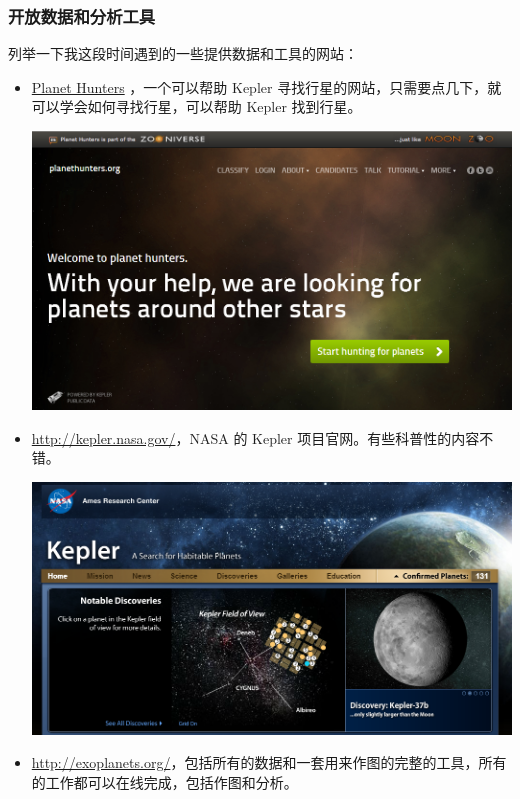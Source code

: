 \documentclass[letterpaper,10pt,english]{sphinxmanual}
\begin{document}
\subsubsection{开放数据和分析工具}
\label{intro:id16}
列举一下我这段时间遇到的一些提供数据和工具的网站：
\begin{itemize}
\item {} 
\href{http://www.planethunters.org/}{Planet Hunters} ，一个可以帮助 Kepler 寻找行星的网站，只需要点几下，就可以学会如何寻找行星，可以帮助 Kepler 找到行星。

\includegraphics{planetHunters.png}

\item {} 
\href{http://kepler.nasa.gov/}{http://kepler.nasa.gov/}，NASA 的 Kepler 项目官网。有些科普性的内容不错。

\includegraphics{Kepler.png}

\item {} 
\href{http://exoplanets.org/}{http://exoplanets.org/}，包括所有的数据和一套用来作图的完整的工具，所有的工作都可以在线完成，包括作图和分析。
\begin{quote}


\end{quote}
\end{itemize}
\end{document}
